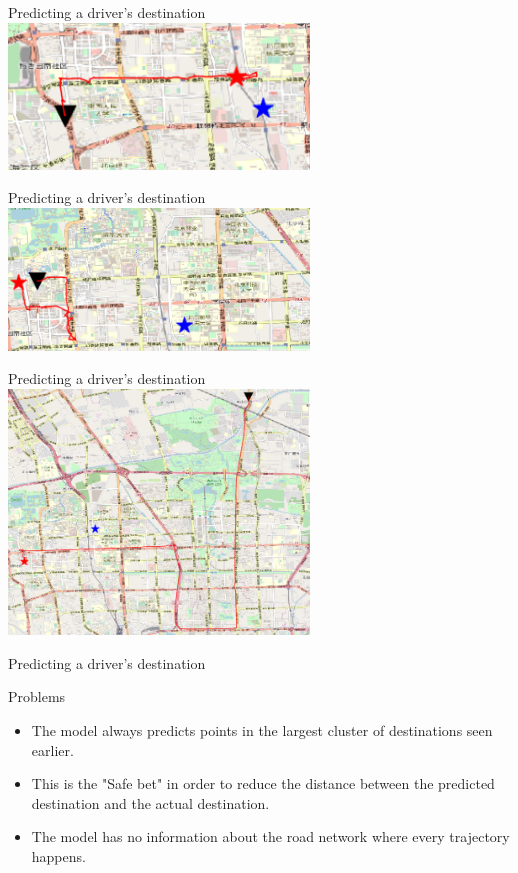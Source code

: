 \documentclass[aspectratio=169]{beamer}
\begin{document}
\begin{frame}{Predicting a driver's destination}
\centering
\includegraphics[width=0.6\textwidth]{figures/ex2_reg}
\end{frame}

\begin{frame}{Predicting a driver's destination}
\centering
\includegraphics[width=0.6\textwidth]{figures/ex3_reg}
\end{frame}

\begin{frame}{Predicting a driver's destination}
\centering
\includegraphics[width=0.6\textwidth]{figures/ex4_reg}
\end{frame}

\begin{frame}{Predicting a driver's destination}

{\Large Problems}

\begin{itemize}
	\item The model always predicts points in the largest cluster of destinations seen earlier.
	\item This is the "Safe bet" in order to reduce the distance between the predicted destination and the actual destination.
	\item The model has no information about the road network where every trajectory happens.
\end{itemize}
\end{frame}
\end{document}
